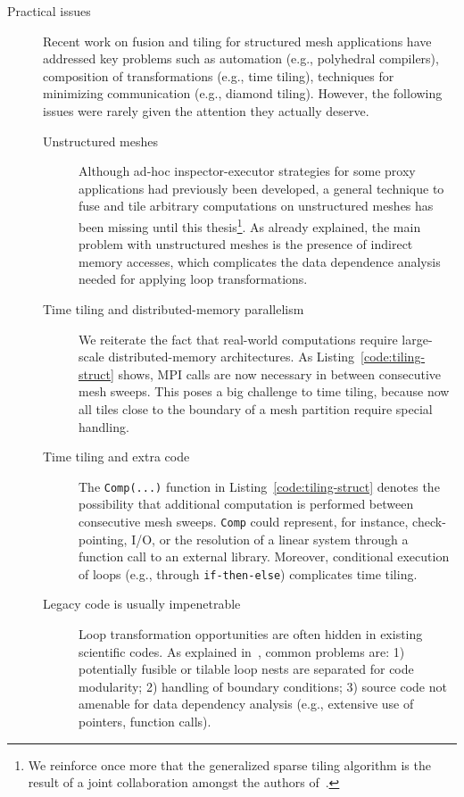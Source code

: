 \begin{description}
\item[Practical issues] Recent work on fusion and tiling for structured mesh applications have addressed key problems such as automation (e.g., polyhedral compilers), composition of transformations (e.g., time tiling), techniques for minimizing communication (e.g., diamond tiling). However, the following issues were rarely given the attention they actually deserve.
\begin{description}
\item[Unstructured meshes] Although ad-hoc inspector-executor strategies for some proxy applications had previously been developed, a general technique to fuse and tile arbitrary computations on unstructured meshes has been missing until this thesis\footnote{We reinforce once more that the generalized sparse tiling algorithm is the result of a joint collaboration amongst the authors of~\citep{st-paper}.}. As already explained, the main problem with unstructured meshes is the presence of indirect memory accesses, which complicates the data dependence analysis needed for applying loop transformations.
\item[Time tiling and distributed-memory parallelism] We reiterate the fact that real-world computations require large-scale distributed-memory architectures. As Listing~\ref{code:tiling-struct} shows, MPI calls are now necessary in between consecutive mesh sweeps. This poses a big challenge to time tiling, because now all tiles close to the boundary of a mesh partition require special handling.
\item[Time tiling and extra code] The {\tt Comp(...)} function in Listing~\ref{code:tiling-struct} denotes the possibility that additional computation is performed between consecutive mesh sweeps. {\tt Comp} could represent, for instance, check-pointing, I/O, or the resolution of a linear system through a function call to an external library. Moreover, conditional execution of loops (e.g., through \texttt{if-then-else}) complicates time tiling. 
\item[Legacy code is usually impenetrable] Loop transformation opportunities are often hidden in existing scientific codes. As explained in~\cite{strout-common-problems}, common problems are: 1) potentially fusible or tilable loop nests are separated for code modularity; 2) handling of boundary conditions; 3) source code not amenable for data dependency analysis (e.g., extensive use of pointers, function calls).
\end{description}


\end{description}
